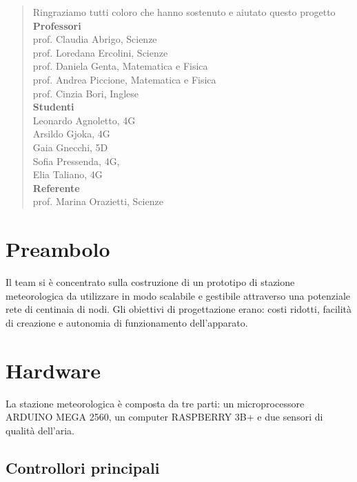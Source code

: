 \documentclass[12pt, a4paper]{article}
\begin{document}
	\clearpage
	\tableofcontents
	\clearpage
	\renewcommand{\abstractname}{Riconoscimenti}
	\begin{center}
		\begin{abstract}
			\vspace{10mm}
			Ringraziamo tutti coloro che hanno sostenuto e aiutato questo progetto\\
			\vspace{10mm}
			\textbf{Professori}\\
			prof. Claudia Abrigo, Scienze\\
			prof. Loredana Ercolini, Scienze\\
			prof. Daniela Genta, Matematica e Fisica\\
			prof. Andrea Piccione, Matematica e Fisica\\
			prof. Cinzia Bori, Inglese\\
			\vspace{10mm}
			\textbf{Studenti}\\
			Leonardo Agnoletto, 4G\\
			Arsildo Gjoka, 4G\\
			Gaia Gnecchi, 5D\\
			Sofia Pressenda, 4G,\\
			Elia Taliano, 4G\\
			\vspace{10mm}
			\textbf{Referente}\\
			prof. Marina Orazietti, Scienze\\
		\end{abstract}
	\end{center}
	
	\clearpage
	\section{Preambolo}
	Il team si è concentrato sulla costruzione di un prototipo di stazione meteorologica da utilizzare in modo scalabile e gestibile attraverso una potenziale rete di centinaia di nodi.
	Gli obiettivi di progettazione erano: costi ridotti, facilità di creazione e autonomia di funzionamento dell'apparato.
	
	\section{Hardware}
	La stazione meteorologica è composta da tre parti: un microprocessore ARDUINO MEGA 2560, un computer RASPBERRY 3B+ e due sensori di qualità dell'aria.
	\subsection{Controllori principali}
	
\end{document}
